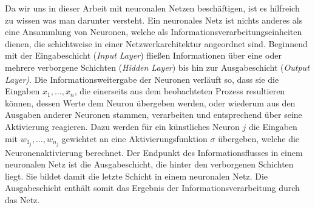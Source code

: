 Da wir uns in dieser Arbeit mit neuronalen Netzen beschäftigen, ist es hilfreich zu wissen was man darunter versteht. Ein neuronales Netz ist nichts anderes als eine Ansammlung von Neuronen, welche als Informationsverarbeitungseinheiten dienen, die schichtweise in einer Netzwerkarchitektur angeordnet sind. Beginnend mit der Eingabeschicht (\textit{Input Layer}) fließen Informationen über eine oder mehrere verborgene Schichten (\textit{Hidden Layer}) bis hin zur Ausgabeschicht (\textit{Output Layer)}. Die Informationsweitergabe der Neuronen verläuft so, dass sie die Eingaben $x_1,\dots,x_n$, die einerseits aus dem beobachteten Prozess resultieren können, dessen Werte dem Neuron übergeben werden, oder wiederum aus den Ausgaben anderer Neuronen stammen, verarbeiten und entsprechend über seine Aktivierung reagieren. Dazu werden für ein künstliches Neuron $j$ die Eingaben mit $w_{1_j}, \dots, w_{n_j}$ gewichtet an eine Aktivierungsfunktion $\sigma$ übergeben, welche die Neuronenaktivierung berechnet. Der Endpunkt des Informationsflusses in einem neuronalen Netz ist die Ausgabeschicht, die hinter den verborgenen Schichten liegt. Sie bildet damit die letzte Schicht in einem neuronalen Netz. Die Ausgabeschicht enthält somit das Ergebnis der Informationsverarbeitung durch das Netz.  
%        
%        
